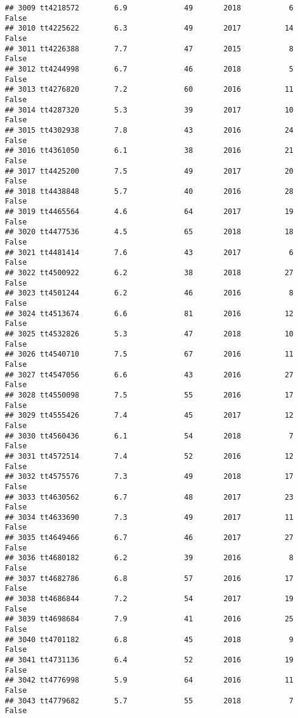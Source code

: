 \documentclass[
]{article}
\begin{document}
\begin{verbatim}
## 3009 tt4218572        6.9             49       2018           6   False
## 3010 tt4225622        6.3             49       2017          14   False
## 3011 tt4226388        7.7             47       2015           8   False
## 3012 tt4244998        6.7             46       2018           5   False
## 3013 tt4276820        7.2             60       2016          11   False
## 3014 tt4287320        5.3             39       2017          10   False
## 3015 tt4302938        7.8             43       2016          24   False
## 3016 tt4361050        6.1             38       2016          21   False
## 3017 tt4425200        7.5             49       2017          20   False
## 3018 tt4438848        5.7             40       2016          28   False
## 3019 tt4465564        4.6             64       2017          19   False
## 3020 tt4477536        4.5             65       2018          18   False
## 3021 tt4481414        7.6             43       2017           6   False
## 3022 tt4500922        6.2             38       2018          27   False
## 3023 tt4501244        6.2             46       2016           8   False
## 3024 tt4513674        6.6             81       2016          12   False
## 3025 tt4532826        5.3             47       2018          10   False
## 3026 tt4540710        7.5             67       2016          11   False
## 3027 tt4547056        6.6             43       2016          27   False
## 3028 tt4550098        7.5             55       2016          17   False
## 3029 tt4555426        7.4             45       2017          12   False
## 3030 tt4560436        6.1             54       2018           7   False
## 3031 tt4572514        7.4             52       2016          12   False
## 3032 tt4575576        7.3             49       2018          17   False
## 3033 tt4630562        6.7             48       2017          23   False
## 3034 tt4633690        7.3             49       2017          11   False
## 3035 tt4649466        6.7             46       2017          27   False
## 3036 tt4680182        6.2             39       2016           8   False
## 3037 tt4682786        6.8             57       2016          17   False
## 3038 tt4686844        7.2             54       2017          19   False
## 3039 tt4698684        7.9             41       2016          25   False
## 3040 tt4701182        6.8             45       2018           9   False
## 3041 tt4731136        6.4             52       2016          19   False
## 3042 tt4776998        5.9             64       2016          11   False
## 3043 tt4779682        5.7             55       2018           7   False

\end{verbatim}
\end{document}
